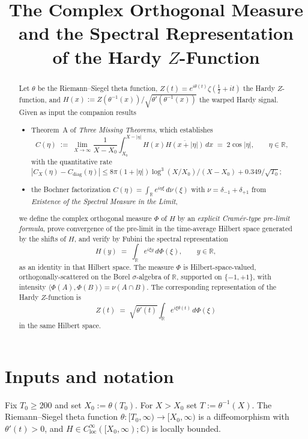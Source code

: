 \documentclass[11pt]{article}
\title{The Complex Orthogonal Measure\\
and the Spectral Representation\\
of the Hardy \texorpdfstring{$Z$}{Z}-Function}
\author{}
\date{}
\theoremstyle{definition}
\theoremstyle{remark}
\begin{document}
\maketitle

\begin{abstract}
Let $\theta$ be the Riemann--Siegel theta function, $Z(t)=e^{i\theta(t)}\zeta(\tfrac12+it)$ the Hardy $Z$-function, and $H(x):=Z(\theta^{-1}(x))/\sqrt{\theta'(\theta^{-1}(x))}$ the warped Hardy signal. Given as input the companion results
\begin{itemize}
\item Theorem~A of \emph{Three Missing Theorems}, which establishes
\[
 C(\eta)\;:=\;\lim_{X\to\infty}\frac{1}{X-X_0}\int_{X_0}^{X-|\eta|} H(x)\overline{H(x+|\eta|)}\,dx\;=\;2\cos|\eta|,\qquad \eta\in\mathbb{R},
\]
with the quantitative rate $|C_X(\eta)-C_{\mathrm{diag}}(\eta)|\le 8\pi(1+|\eta|)\log^3(X/X_0)/(X-X_0)+0.349/\sqrt{T_0}$;
\item the Bochner factorization $C(\eta)=\int_{\mathbb{R}} e^{i\eta\xi}\,d\nu(\xi)$ with $\nu=\delta_{-1}+\delta_{+1}$ from \emph{Existence of the Spectral Measure in the Limit},
\end{itemize}
we define the complex orthogonal measure $\Phi$ of $H$ by an \emph{explicit Cram\'er-type pre-limit formula}, prove convergence of the pre-limit in the time-average Hilbert space generated by the shifts of $H$, and verify by Fubini the spectral representation
\[
  H(y)\;=\;\int_{\mathbb{R}} e^{i\xi y}\,d\Phi(\xi),\qquad y\in\mathbb{R},
\]
as an identity in that Hilbert space. The measure $\Phi$ is Hilbert-space-valued, orthogonally-scattered on the Borel $\sigma$-algebra of $\mathbb{R}$, supported on $\{-1,+1\}$, with intensity $\langle\Phi(A),\Phi(B)\rangle=\nu(A\cap B)$. The corresponding representation of the Hardy $Z$-function is
\[
  Z(t)\;=\;\sqrt{\theta'(t)}\int_{\mathbb{R}} e^{i\xi\theta(t)}\,d\Phi(\xi)
\]
in the same Hilbert space.
\end{abstract}

\section{Inputs and notation}\label{sec:inputs}

Fix $T_0\ge 200$ and set $X_0:=\theta(T_0)$. For $X>X_0$ set $T:=\theta^{-1}(X)$. The Riemann--Siegel theta function $\theta:[T_0,\infty)\to[X_0,\infty)$ is a diffeomorphism with $\theta'(t)>0$, and $H\in C_{\mathrm{loc}}^\infty([X_0,\infty);\mathbb{C})$ is locally bounded.
\end{document}
